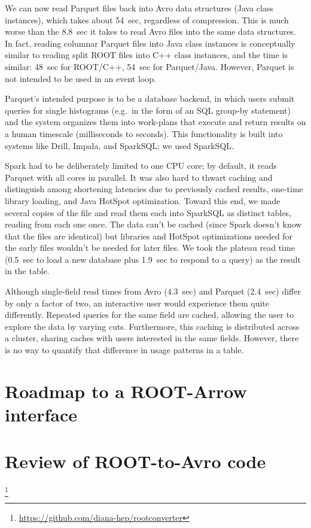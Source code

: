 \documentclass{article}
\begin{document}
We can now read Parquet files back into Avro data structures (Java class instances), which takes about 54~sec, regardless of compression. This is much worse than the 8.8~sec it takes to read Avro files into the same data structures. In fact, reading columnar Parquet files into Java class instances is conceptually similar to reading split ROOT files into C++ class instances, and the time is similar: 48~sec for ROOT/C++, 54~sec for Parquet/Java. However, Parquet is not intended to be used in an event loop.

Parquet's intended purpose is to be a database backend, in which users submit queries for single histograms (e.g.\ in the form of an SQL group-by statement) and the system organizes them into work-plans that execute and return results on a human timescale (milliseconds to seconds). This functionality is built into systems like Drill, Impala, and SparkSQL; we used SparkSQL.

Spark had to be deliberately limited to one CPU core; by default, it reads Parquet with all cores in parallel. It was also hard to thwart caching and distinguish among shortening latencies due to previously cached results, one-time library loading, and Java HotSpot optimization. Toward this end, we made several copies of the file and read them each into SparkSQL as distinct tables, reading from each one once. The data can't be cached (since Spark doesn't know that the files are identical) but libraries and HotSpot optimizations needed for the early files wouldn't be needed for later files. We took the plateau read time (0.5~sec to load a new database plus 1.9~sec to respond to a query) as the result in the table.

Although single-field read times from Avro (4.3~sec) and Parquet (2.4~sec) differ by only a factor of two, an interactive user would experience them quite differently. Repeated queries for the same field are cached, allowing the user to explore the data by varying cuts. Furthermore, this caching is distributed across a cluster, sharing caches with users interested in the same fields. However, there is no way to quantify that difference in usage patterns in a table.

\section*{Roadmap to a ROOT-Arrow interface}




\section*{Review of ROOT-to-Avro code}

\footnote{\url{https://github.com/diana-hep/rootconverter}}
\end{document}
